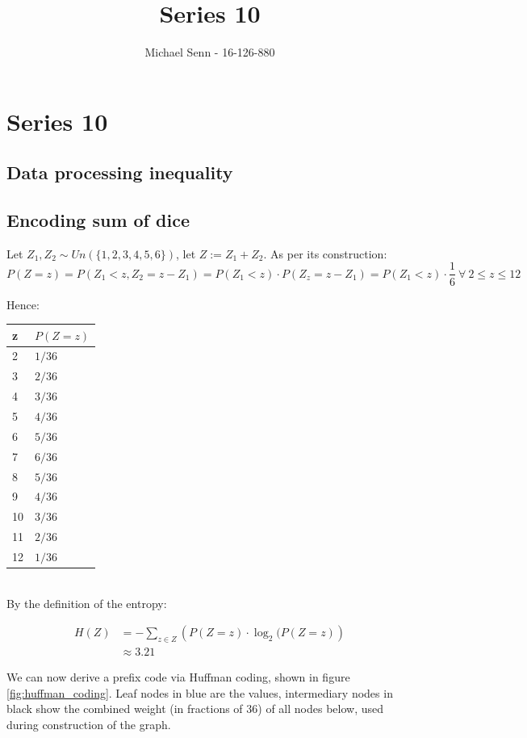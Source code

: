 \documentclass[a4paper]{scrreprt}
\title{Series 10}
\author{Michael Senn \maillink{michael.senn@students.unibe.ch} - 16-126-880}
\date{\printdate}
\begin{document}
\maketitle


\setcounter{chapter}{9}
\chapter{Series 10}

\section{Data processing inequality}

\section{Encoding sum of dice}

Let $Z_1, Z_2 \sim Un(\{1, 2, 3, 4, 5, 6\})$, let $Z := Z_1 + Z_2$. As per its
construction:
\[
	P(Z = z) = P(Z_1 < z, Z_2 = z - Z_1) = P(Z_1 < z) \cdot P(Z_z = z -Z_1) = P(Z_1 < z) \cdot \frac{1}{6}\ \forall\ 2 \leq z \leq 12
\]

Hence:
\\

\begin{tabu}{ll}
	\toprule
	z & $P(Z = z)$ \\
	  & $1 / 36$ \\
	3  & $2 / 36$ \\
	4  & $3 / 36$ \\
	5  & $4 / 36$ \\
	6  & $5 / 36$ \\
	7  & $6 / 36$ \\
	8  & $5 / 36$ \\
	9  & $4 / 36$ \\
	10 & $3 / 36$ \\
	11 & $2 / 36$ \\
	12 & $1 / 36$ \\
	\bottomrule
\end{tabu}
\\

By the definition of the entropy:

\begin{align*}
	H(Z) & = -\sum_{z \in Z}{\left(P(Z = z) \cdot \log_2(P(Z=z)\right)} \\
	& \approx 3.21
\end{align*}

We can now derive a prefix code via Huffman coding, shown in figure
\ref{fig:huffman_coding}. Leaf nodes in blue are the values, intermediary nodes
in black show the combined weight (in fractions of $36$) of all nodes below,
used during construction of the graph.
\end{document}
